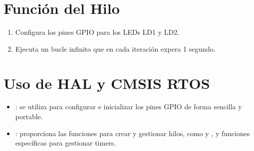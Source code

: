 \documentclass[letterpaper,10pt,english]{sphinxmanual}
\begin{document}
\section{Función del Hilo }
\label{\detokenize{ejemplothreads-software-timers:funcion-del-hilo-timers}}\begin{description}
\begin{enumerate}
%
\item {} 
\sphinxAtStartPar
Configura los pines GPIO para los LEDs LD1 y LD2.

\item {} 
\sphinxAtStartPar
Ejecuta un bucle infinito que en cada iteración expera 1 segundo.

\end{enumerate}

\end{description}


\section{Uso de HAL y CMSIS RTOS}
\label{\detokenize{ejemplothreads-software-timers:uso-de-hal-y-cmsis-rtos}}\begin{itemize}
\item {} 
\sphinxAtStartPar
{}: se utiliza para configurar e inicializar los pines GPIO de forma sencilla y portable.

\item {} 
\sphinxAtStartPar
{}: proporciona las funciones para crear y gestionar hilos, como  y , y funciones específicas para gestionar timers.

\end{itemize}
\end{document}
